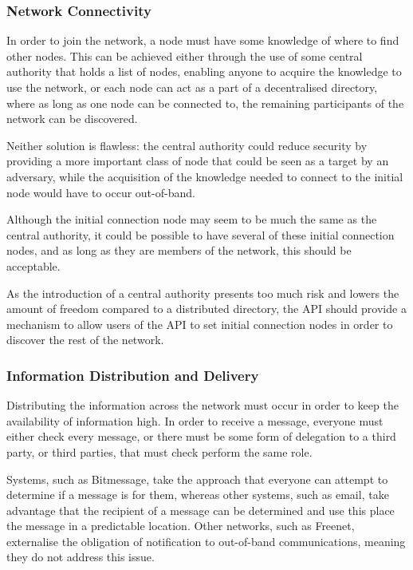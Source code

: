 		\subsubsection*{Network Connectivity}
			In order to join the network, a node must have some knowledge of where to find other nodes. This can be achieved either through the use of some central authority that holds a list of nodes, enabling anyone to acquire the knowledge to use the network, or each node can act as a part of a decentralised directory, where as long as one node can be connected to, the remaining participants of the network can be discovered.
			
			Neither solution is flawless: the central authority could reduce security by providing a more important class of node that could be seen as a target by an adversary, while the acquisition of the knowledge needed to connect to the initial node would have to occur out-of-band.
			
			Although the initial connection node may seem to be much the same as the central authority, it could be possible to have several of these initial connection nodes, and as long as they are members of the network, this should be acceptable.
			
			As the introduction of a central authority presents too much risk and lowers the amount of freedom compared to a distributed directory, the API should provide a mechanism to allow users of the API to set initial connection nodes in order to discover the rest of the network.		
		\subsubsection*{Information Distribution and Delivery}
			Distributing the information across the network must occur in order to keep the availability of information high. In order to receive a message, everyone must either check every message, or there must be some form of delegation to a third party, or third parties, that must check perform the same role.
			
			Systems, such as Bitmessage, take the approach that everyone can attempt to determine if a message is for them, whereas other systems, such as email, take advantage that the recipient of a message can be determined and use this place the message in a predictable location. Other networks, such as Freenet, externalise  the obligation of notification to out-of-band communications, meaning they do not address this issue.
			
